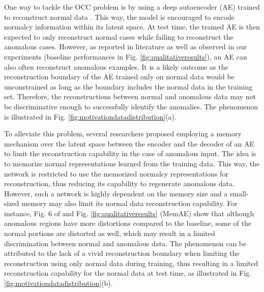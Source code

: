 \documentclass{bmvc2k}
\begin{document}
One way to tackle the OCC problem is by using a deep autoencoder (AE) trained to reconstruct normal data 
\cite{hasan2016learning,zhao2017spatio,luo2017revisit,luo2017remembering,gong2019memorizing,park2020learning}. This way, the model is encouraged to encode normalcy information within its latent space. 
At test time, the trained AE is then expected to only reconstruct normal cases while failing to reconstruct the anomalous cases.
However, 
as reported in literature \cite{zong2018deep,munawar2017limiting,zaheer2020old,gong2019memorizing} as well as observed in our experiments (baseline performances in Fig. \ref{fig:qualitativeresults}), 
an AE can also often reconstruct anomalous examples. It is a likely outcome as the reconstruction boundary of the AE trained only on normal data would be unconstrained as long as the boundary includes the normal data in the training set.
Therefore, the reconstructions between normal and anomalous data may not be discriminative enough to successfully identify the anomalies. 
The phenomenon is illustrated in Fig. \ref{fig:motivationdatadistribution}(a).

To alleviate this problem, several researchers \cite{gong2019memorizing,park2020learning} proposed employing a memory mechanism over the latent space between the encoder and the decoder of an AE to limit the reconstruction capability in the case of anomalous input. The idea is to memorize normal representations learned from the training data. This way, the network is restricted to use the memorized normalcy representations for reconstruction, thus reducing its capability to regenerate anomalous data. 
However, such a network is highly dependent on the memory size and a small-sized memory may also limit its normal data reconstruction capability. For instance, Fig. 6 of \cite{gong2019memorizing} and Fig. \ref{fig:qualitativeresults} (MemAE) show that although anomalous regions have more distortions compared to the baseline, some of the normal portions are distorted as well, which may result in a limited discrimination between normal and anomalous data. The phenomenon can be attributed to the lack of a vivid reconstruction boundary when limiting the reconstruction using only normal data during training, thus resulting in a limited reconstruction capability for the normal data at test time, as illustrated in Fig. \ref{fig:motivationdatadistribution}(b). 
\end{document}
